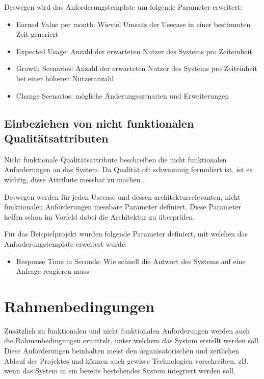 Deswegen wird das Anforderungstemplate um folgende Parameter erweitert:

\begin{itemize}
  \item Earned Value per month: Wieviel Umsatz der Usecase in einer bestimmten Zeit generiert
  \item Expected Usage: Anzahl der erwarteten Nutzer des Systems pro Zeiteinheit
  \item Growth Scenarios: Anzahl der erwarteten Nutzer des Systems pro Zeiteinheit bei einer höheren Nutzeranzahl
  \item Change Scenarios: mögliche Änderungsszenarien und Erweiterungen
\end{itemize}

\subsection{Einbeziehen von nicht funktionalen Qualitätsattributen}
Nicht funktionale Qualitätsattribute beschreiben die nicht funktionalen Anforderungen an das System. Da Qualität oft schwammig formuliert ist, ist es wichtig, diese Attribute messbar zu machen \cite[S. 9]{effektiv}.

Deswegen werden für jeden Usecase und dessen architekturrelevanten, nicht funktionalen Anforderungen messbare Parameter definiert. Diese Parameter helfen schon im Vorfeld dabei die Architektur zu überprüfen.

Für das Beispielprojekt wurden folgende Parameter definiert, mit welchen das Anforderungstemplate erweitert wurde:

\begin{itemize}
  \item Response Time in Seconds: Wie schnell die Antwort des Systems auf eine Anfrage reagieren muss
\end{itemize}

\section{Rahmenbedingungen}
Zusätzlich zu funktionalen und nicht funktionalen Anforderungen werden auch die Rahmenbedingungen ermittelt, unter welchem das System erstellt werden soll. Diese Anforderungen beinhalten meist den organisatorischen und zeitlichen Ablauf des Projektes und können auch gewisse Technologien vorschreiben, zB. wenn das System in ein bereits bestehendes System integriert werden soll. \cite[S. 9]{review}\cite[S. 110]{softarch}

